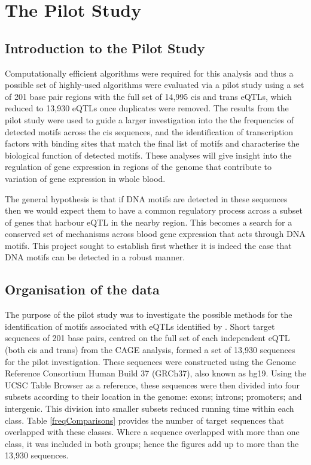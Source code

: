 \documentclass[12pt]{article}
\begin{document}
\section{The Pilot Study}
\subsection{Introduction to the Pilot Study}
Computationally efficient algorithms were required for this analysis and thus a possible set of highly-used algorithms were evaluated via a pilot study using a set of 201 base pair regions with the full set of 14,995 cis and trans eQTLs, which reduced to 13,930 eQTLs once duplicates were removed. The results from the pilot study were used to guide a larger investigation into the the frequencies of detected motifs across the cis sequences, and the identification of transcription factors with binding sites that match the final list of motifs and characterise the biological function of detected motifs. These analyses will give insight into the regulation of gene expression in regions of the genome that contribute to variation of gene expression in whole blood. 

The general hypothesis is that if DNA motifs are detected in these sequences then we would expect them to have a common regulatory process across a subset of genes that harbour eQTL in the nearby region. This becomes a search for a conserved set of mechanisms across blood gene expression that acts through DNA motifs. This project sought to establish first whether it is indeed the case that DNA motifs can be detected in a robust manner.




\subsection{Organisation of the data}

The purpose of the pilot study was to investigate the possible methods for the identification of motifs associated with eQTLs identified by  \citet{lloyd2017genetic}. Short target sequences of 201 base pairs, centred on the full set of each independent eQTL (both cis and trans) from the CAGE analysis, formed a set of 13,930 sequences for the pilot investigation. These sequences were constructed using the Genome Reference Consortium Human Build 37 (GRCh37)\citep{Lander2001}, also known as hg19. Using the UCSC Table Browser \citep{karolchik2004ucsc} as a reference, these sequences were then divided into four subsets according to their location in the genome: exons; introns; promoters; and intergenic. This division into smaller subsets reduced running time within each class. Table \ref{freqComparisons} provides the number of target sequences that overlapped with these classes. Where a sequence overlapped with more than one class, it was included in both groups; hence the figures add up to more than the 13,930 sequences.
\end{document}
